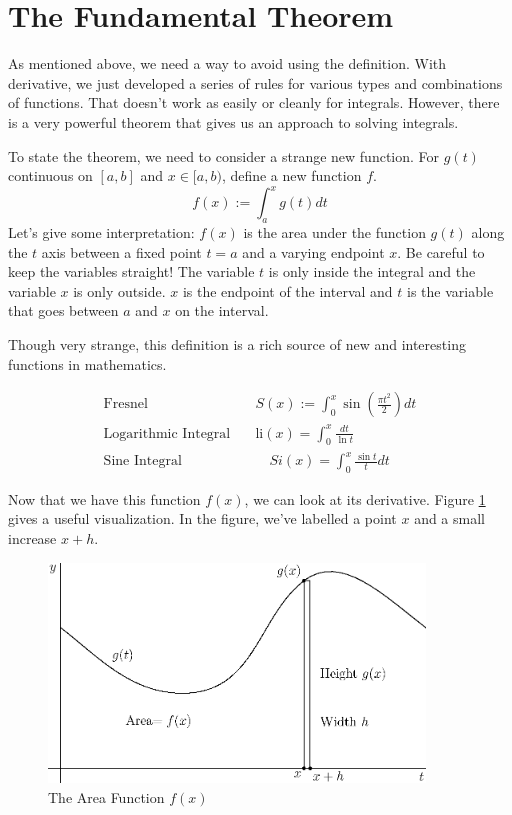 \documentclass[fleqn]{report}
\begin{document}
\section{The Fundamental Theorem} 
\label{fundamental-theorem}

As mentioned above, we need a way to avoid using the
definition. With derivative, we just developed a series of
rules for various types and combinations of functions. That
doesn't work as easily or cleanly for integrals. However,
there is a very powerful theorem that gives us an approach to
solving integrals.

To state the theorem, we need to consider a strange new
function. For $g(t)$ continuous on $[a,b]$ and $x \in [a,b)$,
define a new function $f$.
\begin{equation*}
f(x) := \int_a^x g(t) dt 
\end{equation*}
Let's give some interpretation: $f(x)$ is the area under the
function $g(t)$ along the $t$ axis between a fixed point
$t=a$ and a varying endpoint $x$. Be careful to keep the
variables straight! The variable $t$ is only inside the
integral and the variable $x$ is only outside. $x$ is the
endpoint of the interval and $t$ is the variable that goes
between $a$ and $x$ on the interval.

Though very strange, this definition is a rich source of new and
interesting functions in mathematics. 

\begin{example}
\begin{align*}
\text{Fresnel} \quad & S(x) := \int_0^x \sin \left(\frac{\pi t^2}{2}
\right) dt \\
\text{Logarithmic Integral} \quad & \text{li}(x) = \int_0^x
\frac{dt}{\ln t} \\
\text{Sine Integral} & \quad Si(x) = \int_0^x \frac{\sin t}{t} dt
\end{align*}
\end{example}

Now that we have this function $f(x)$, we can look at its
derivative. Figure \ref{figure-area-function} gives a useful
visualization. In the figure,  we've labelled a
point $x$ and a small increase $x+h$.

\begin{figure}[t]
\centering
\includegraphics[width=10cm]{figure53.eps}
\caption{The Area Function $f(x)$}
\label{figure-area-function}
\end{figure}
\end{document}
